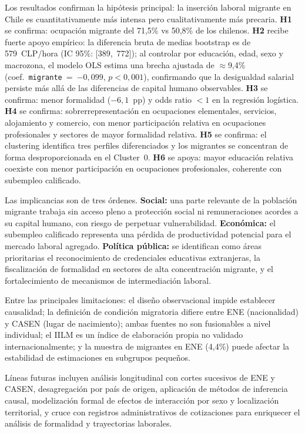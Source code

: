 Los resultados confirman la hipótesis principal: la inserción laboral migrante en Chile es cuantitativamente más intensa pero cualitativamente más precaria. \textbf{H1} se confirma: ocupación migrante del 71,5\% vs 50,8\% de los chilenos. \textbf{H2} recibe fuerte apoyo empírico: la diferencia bruta de medias bootstrap es de 579~CLP/hora (IC 95\%: [389,~772]); al controlar por educación, edad, sexo y macrozona, el modelo OLS estima una brecha ajustada de $\approx$9,4\% (coef.~\texttt{migrante}~=~$-0{,}099$, $p<0{,}001$), confirmando que la desigualdad salarial persiste más allá de las diferencias de capital humano observables. \textbf{H3} se confirma: menor formalidad ($-6{,}1$~pp) y odds ratio $<1$ en la regresión logística. \textbf{H4} se confirma: sobrerrepresentación en ocupaciones elementales, servicios, alojamiento y comercio, con menor participación relativa en ocupaciones profesionales y sectores de mayor formalidad relativa. \textbf{H5} se confirma: el clustering identifica tres perfiles diferenciados y los migrantes se concentran de forma desproporcionada en el Cluster~0. \textbf{H6} se apoya: mayor educación relativa coexiste con menor participación en ocupaciones profesionales, coherente con subempleo calificado.

Las implicancias son de tres órdenes. \textbf{Social:} una parte relevante de la población migrante trabaja sin acceso pleno a protección social ni remuneraciones acordes a su capital humano, con riesgo de perpetuar vulnerabilidad. \textbf{Económica:} el subempleo calificado representa una pérdida de productividad potencial para el mercado laboral agregado. \textbf{Política pública:} se identifican como áreas prioritarias el reconocimiento de credenciales educativas extranjeras, la fiscalización de formalidad en sectores de alta concentración migrante, y el fortalecimiento de mecanismos de intermediación laboral.


Entre las principales limitaciones: el diseño observacional impide establecer causalidad; la definición de condición migratoria difiere entre ENE (nacionalidad) y CASEN (lugar de nacimiento); ambas fuentes no son fusionables a nivel individual; el IILM es un índice de elaboración propia no validado internacionalmente; y la muestra de migrantes en ENE (4,4\%) puede afectar la estabilidad de estimaciones en subgrupos pequeños.


Líneas futuras incluyen análisis longitudinal con cortes sucesivos de ENE y CASEN, desagregación por país de origen, aplicación de métodos de inferencia causal, modelización formal de efectos de interacción por sexo y localización territorial, y cruce con registros administrativos de cotizaciones para enriquecer el análisis de formalidad y trayectorias laborales.
